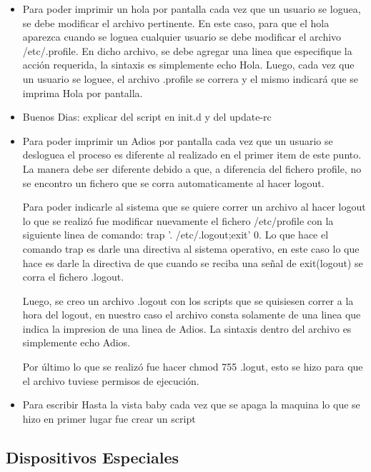 \documentclass[a4paper, 12pt]{article}
\begin{document}
\begin{itemize}
\item Para poder imprimir un hola por pantalla cada vez que un usuario se loguea, se debe modificar el archivo pertinente. En este caso, para que el hola aparezca cuando se loguea cualquier usuario se debe modificar el archivo /etc/.profile. En dicho archivo, se debe agregar una linea que especifique la acci\'on requerida, la sintaxis es simplemente echo Hola. Luego, cada vez que un usuario se loguee, el archivo .profile se correra y el mismo indicar\'a que se imprima Hola por pantalla.

\item Buenos Dias: explicar del script en init.d y del update-rc


\item Para poder imprimir un Adios por pantalla cada vez que un usuario se desloguea el proceso es diferente al realizado en el primer item de este punto. La manera debe ser diferente debido a que, a diferencia del fichero profile, no se encontro un fichero que se corra automaticamente al hacer logout. 

Para poder indicarle al sistema que se quiere correr un archivo al hacer logout lo que se realiz\'o fue modificar nuevamente el fichero /etc/profile con la siguiente linea de comando: trap '. /etc/.logout;exit' 0. Lo que hace el comando trap es darle una directiva al sistema operativo, en este caso lo que hace es darle la directiva de que cuando se reciba una se\~{n}al de exit(logout) se corra el fichero .logout.

Luego, se creo un archivo .logout con los scripts que se quisiesen correr a la hora del logout, en nuestro caso el archivo consta solamente de una linea que indica la impresion de una linea de Adios. La sintaxis dentro del archivo es simplemente echo Adios.

Por \'ultimo lo que se realiz\'o fue hacer chmod 755 .logut, esto se hizo para que el archivo tuviese permisos de ejecuci\'on.

\item Para escribir Hasta la vista baby cada vez que se apaga la maquina lo que se hizo en primer lugar fue crear un script 


\end{itemize}

\subsection*{Dispositivos Especiales}
\end{document}
